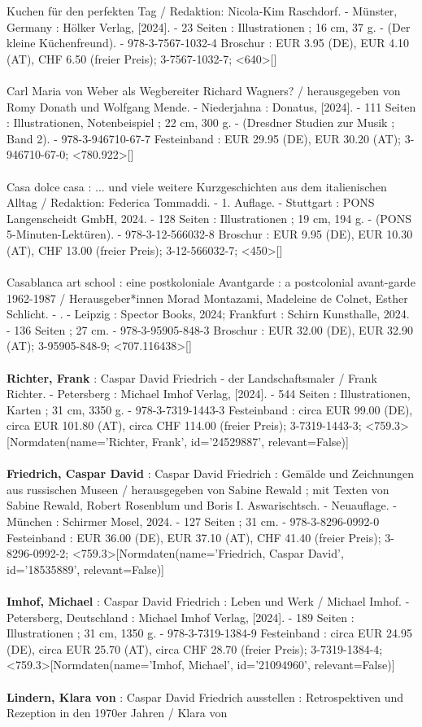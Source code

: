 \documentclass{article}
\begin{document}
\begin{multicols}{3}
Kuchen für den perfekten Tag / Redaktion: Nicola-Kim Raschdorf. - Münster, Germany : Hölker Verlag, [2024]. - 23 Seiten : Illustrationen ; 16 cm, 37 g. - (Der kleine Küchenfreund). - 978-3-7567-1032-4 Broschur : EUR 3.95 (DE), EUR 4.10 (AT), CHF 6.50 (freier Preis); 3-7567-1032-7; <640>[]\\\\Carl Maria von Weber als Wegbereiter Richard Wagners? / herausgegeben von Romy Donath und Wolfgang Mende. - Niederjahna : Donatus, [2024]. - 111 Seiten : Illustrationen, Notenbeispiel ; 22 cm, 300 g. - (Dresdner Studien zur Musik ; Band 2). - 978-3-946710-67-7 Festeinband : EUR 29.95 (DE), EUR 30.20 (AT); 3-946710-67-0; <780.922>[]\\\\Casa dolce casa : ... und viele weitere Kurzgeschichten aus dem italienischen Alltag / Redaktion: Federica Tommaddi. - 1. Auflage. - Stuttgart : PONS Langenscheidt GmbH, 2024. - 128 Seiten : Illustrationen ; 19 cm, 194 g. - (PONS 5-Minuten-Lektüren). - 978-3-12-566032-8 Broschur : EUR 9.95 (DE), EUR 10.30 (AT), CHF 13.00 (freier Preis); 3-12-566032-7; <450>[]\\\\Casablanca art school : eine postkoloniale Avantgarde : a postcolonial avant-garde 1962-1987 / Herausgeber*innen Morad Montazami, Madeleine de Colnet, Esther Schlicht. - . - Leipzig : Spector Books, 2024; Frankfurt : Schirn Kunsthalle, 2024. - 136 Seiten ; 27 cm. - 978-3-95905-848-3 Broschur : EUR 32.00 (DE), EUR 32.90 (AT); 3-95905-848-9; <707.116438>[]\\\\\textbf{Richter, Frank} : Caspar David Friedrich - der Landschaftsmaler / Frank Richter. - Petersberg : Michael Imhof Verlag, [2024]. - 544 Seiten : Illustrationen, Karten ; 31 cm, 3350 g. - 978-3-7319-1443-3 Festeinband : circa EUR 99.00 (DE), circa EUR 101.80 (AT), circa CHF 114.00 (freier Preis); 3-7319-1443-3; <759.3>[Normdaten(name='Richter, Frank', id='24529887', relevant=False)]\\\\\textbf{Friedrich, Caspar David} : Caspar David Friedrich : Gemälde und Zeichnungen aus russischen Museen / herausgegeben von Sabine Rewald ; mit Texten von Sabine Rewald, Robert Rosenblum und Boris I. Aswarischtsch. - Neuauflage. - München : Schirmer Mosel, 2024. - 127 Seiten ; 31 cm. - 978-3-8296-0992-0 Festeinband : EUR 36.00 (DE), EUR 37.10 (AT), CHF 41.40 (freier Preis); 3-8296-0992-2; <759.3>[Normdaten(name='Friedrich, Caspar David', id='18535889', relevant=False)]\\\\\textbf{Imhof, Michael} : Caspar David Friedrich : Leben und Werk / Michael Imhof. - Petersberg, Deutschland : Michael Imhof Verlag, [2024]. - 189 Seiten : Illustrationen ; 31 cm, 1350 g. - 978-3-7319-1384-9 Festeinband : circa EUR 24.95 (DE), circa EUR 25.70 (AT), circa CHF 28.70 (freier Preis); 3-7319-1384-4; <759.3>[Normdaten(name='Imhof, Michael', id='21094960', relevant=False)]\\\\\textbf{Lindern, Klara von} : Caspar David Friedrich ausstellen : Retrospektiven und Rezeption in den 1970er Jahren / Klara von 
\end{multicols}
\end{document}
